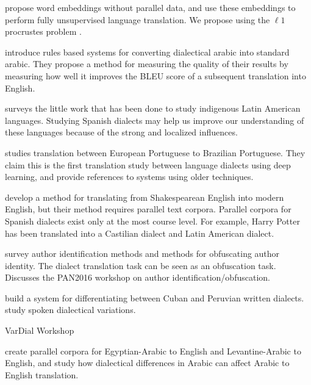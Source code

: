\documentclass[10pt]{article}
\begin{document}
\citet{conneau2017word} propose word embeddings without parallel data,
and \citet{lample2017unsupervised} use these embeddings to perform fully unsupervised language translation.
We propose using the $\ell1$  procrustes problem \citep{trendafilov2003ell,trendafilov2004ell}.

\citet{salloum2011dialectal,salloum2013dialectal} introduce rules based systems for converting dialectical arabic into standard arabic.
They propose a method for measuring the quality of their results by measuring how well it improves the BLEU score of a subsequent translation into English.

\citet{mager2018challenges} surveys the little work that has been done to study indigenous Latin American languages.
Studying Spanish dialects may help us improve our understanding of these languages because of the strong and localized influences.

\citet{costa2018neural} studies translation between European Portuguese to Brazilian Portuguese.
They claim this is the first translation study between language dialects using deep learning,
and provide references to systems using older techniques.

\citet{xu2012paraphrasing} develop a method for translating from Shakespearean English into modern English,
but their method requires parallel text corpora.
Parallel corpora for Spanish dialects exist only at the most course level.
For example, Harry Potter has been translated into a Castilian dialect and Latin American dialect.

\citet{potthast2016author} survey author identification methods and methods for obfuscating author identity.
The dialect translation task can be seen as an obfuscation task.
Discusses the PAN2016 workshop on author identification/obfuscation.

\citet{zissman1996automatic} build a system for differentiating between Cuban and Peruvian written dialects.
\citet{yanguas1998incorporating;caballero2009multidialectal} study spoken dialectical variations.

VarDial Workshop

\citet{zbib2012machine} create parallel corpora for Egyptian-Arabic to English and Levantine-Arabic to English,
and study how dialectical differences in Arabic can affect Arabic to English translation.

\small


\end{document}
